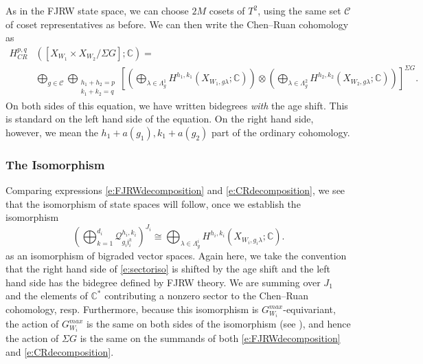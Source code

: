 \documentclass[10pt, letterpaper]{amsart}
\theoremstyle{remark}
\newcommand{\CC}{\mathbb C}
\newcommand{\cC}{\mathcal{C}}
\newcommand{\sQ}{\mathscr{Q}}
\newcommand{\jw}{\mathfrak{j}}
\newcommand{\s}[1]{\Sigma #1}
\begin{document}


As in the FJRW state space, we can choose $2M$ cosets of $T^2$, using the same set $\cC$ of coset representatives as before. We can then write the Chen--Ruan cohomology as 
\begin{align}
H_{CR}^{p,q}&([X_{W_1}\times X_{W_2}/\s{G}];\CC)=\nonumber\\
	&\bigoplus_{g\in \cC}\bigoplus_{\substack{h_1+h_2=p\\k_1+k_2=q}}\left[\left(\bigoplus_{\lambda\in \Lambda^1_{g}}H^{h_1,k_1}(X_{W_1,g\lambda};\CC)\right)\otimes\left(\bigoplus_{\lambda\in \Lambda^2_{g}}H^{h_2,k_2}(X_{W_2,g\lambda};\CC)\right)\right]^{\s{G}}.\label{e:CRdecomposition}
\end{align} 
On both sides of this equation, we have written bidegrees \emph{with} the age shift. This is standard on the left hand side of the equation. On the right hand side, however, we mean the $h_1+a(g_1),k_1+a(g_2)$ part of the ordinary cohomology. 




\subsubsection{The Isomorphism}


Comparing expressions \eqref{e:FJRWdecomposition} and \eqref{e:CRdecomposition}, we see that the isomorphism of state spaces will follow, once we establish the isomorphism
\begin{equation}\label{e:sectoriso}
\left(\bigoplus_{k=1}^{d_i}\sQ_{g_i\jw_i^k}^{h_i,k_i}\right)^{J_i}
\cong \bigoplus_{\lambda\in \Lambda^i_{g}}H^{h_i,k_i}(X_{W_i,g_i\lambda};\CC).
\end{equation}
as an isomorphism of bigraded vector spaces. Again here, we take the convention that the right hand side of \eqref{e:sectoriso} is shifted by the age shift and the left hand side has the bidegree defined by FJRW theory. We are summing over $J_1$ and the elements of $\CC^*$ contributing a nonzero sector to the Chen--Ruan cohomology, resp.  %
Furthermore, because this isomorphism is $G_{W_i}^{max}$-equivariant, the action of $G_{W_i}^{max}$ is the same on both sides of the isomorphism (see \cite{ChR}), and hence the action of $\s{G}$ is the same on the summands of both \eqref{e:FJRWdecomposition} and \eqref{e:CRdecomposition}. 
\end{document}
